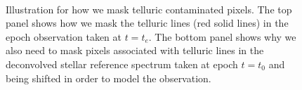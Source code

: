 \begin{figure}
\\
\caption{Illustration for how we mask telluric contaminated
pixels. The top panel shows how we mask the telluric lines (red solid
lines) in the epoch observation taken at $t=t_e$. The bottom panel
shows why we also need to mask pixels associated with telluric lines
in the deconvolved stellar reference spectrum taken at epoch $t=t_0$
and being shifted in order to model the observation.
\label{telluric:fig:dsstmask}}
\end{figure}


